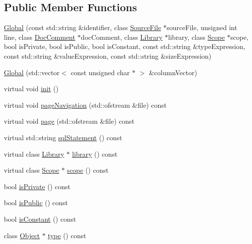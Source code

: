 \subsection*{Public Member Functions}
\begin{CompactItemize}
\item 
\hyperlink{classvjassdoc_1_1Global_9914271ade5a5e8cd9261a29cbbb9516}{Global} (const std::string \&identifier, class \hyperlink{classvjassdoc_1_1SourceFile}{SourceFile} $\ast$sourceFile, unsigned int line, class \hyperlink{classvjassdoc_1_1DocComment}{DocComment} $\ast$docComment, class \hyperlink{classvjassdoc_1_1Library}{Library} $\ast$library, class \hyperlink{classvjassdoc_1_1Scope}{Scope} $\ast$scope, bool isPrivate, bool isPublic, bool isConstant, const std::string \&typeExpression, const std::string \&valueExpression, const std::string \&sizeExpression)
\item 
\hyperlink{classvjassdoc_1_1Global_4b22573ef7ba055be457713685a7b067}{Global} (std::vector$<$ const unsigned char $\ast$ $>$ \&columnVector)
\item 
virtual void \hyperlink{classvjassdoc_1_1Global_9e6189cfd577f0453988e8c8c6eec04d}{init} ()
\item 
virtual void \hyperlink{classvjassdoc_1_1Global_8c5209b5652d3633feb1d7fab796b439}{pageNavigation} (std::ofstream \&file) const 
\item 
virtual void \hyperlink{classvjassdoc_1_1Global_1b8fefe2b9c895c122a822bac0383f1b}{page} (std::ofstream \&file) const 
\item 
virtual std::string \hyperlink{classvjassdoc_1_1Global_4e9a8ea0c8bc34f6980d31676e497531}{sqlStatement} () const 
\item 
virtual class \hyperlink{classvjassdoc_1_1Library}{Library} $\ast$ \hyperlink{classvjassdoc_1_1Global_cbf7be8310f31bd7dc142b290020b4a9}{library} () const 
\item 
virtual class \hyperlink{classvjassdoc_1_1Scope}{Scope} $\ast$ \hyperlink{classvjassdoc_1_1Global_239f8dbfff5e8ed7580d6ba9aadd5f55}{scope} () const 
\item 
bool \hyperlink{classvjassdoc_1_1Global_58459a301561ab4f9995d303365176b2}{isPrivate} () const 
\item 
bool \hyperlink{classvjassdoc_1_1Global_0294eb0932bb61f8fbca0d96d6a478a5}{isPublic} () const 
\item 
bool \hyperlink{classvjassdoc_1_1Global_cbefeff067aa589f960f261991d4213a}{isConstant} () const 
\item 
class \hyperlink{classvjassdoc_1_1Object}{Object} $\ast$ \hyperlink{classvjassdoc_1_1Global_79c4a6767d7e87b7429386f106082f96}{type} () const 

\end{CompactItemize}
